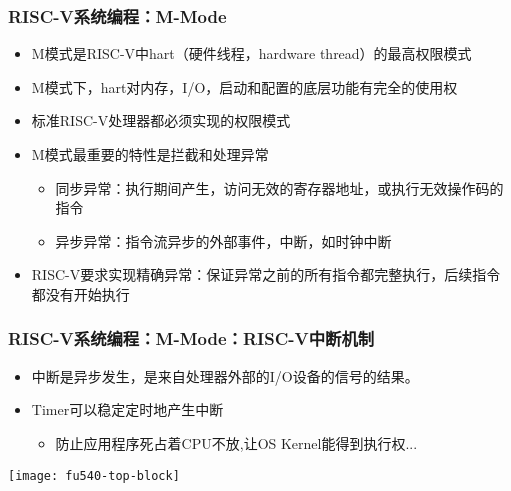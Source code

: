 \begin{frame}
    \frametitle{RISC-V系统编程：M-Mode}
    \begin{itemize}
        \item M模式是RISC-V中hart（硬件线程，hardware thread）的最高权限模式       
        \item M模式下，hart对内存，I/O，启动和配置的底层功能有完全的使用权
        \item 标准RISC-V处理器都必须实现的权限模式
        \item M模式最重要的特性是拦截和处理异常
        \begin{itemize}
            \item 同步异常：执行期间产生，访问无效的寄存器地址，或执行无效操作码的指令
            \item 异步异常：指令流异步的外部事件，中断，如时钟中断
        \end{itemize}				
        \item RISC-V要求实现精确异常：保证异常之前的所有指令都完整执行，后续指令都没有开始执行
    \end{itemize}
    
\end{frame}


\begin{frame}[plain]
    \frametitle{RISC-V系统编程：M-Mode：RISC-V中断机制}
    \begin{itemize}
        \item 中断是异步发生，是来自处理器外部的I/O设备的信号的结果。
        
        
        \item Timer可以稳定定时地产生中断
        \begin{itemize}
            \item 防止应用程序死占着CPU不放,让OS Kernel能得到执行权...
        \end{itemize}				
        
    \end{itemize}
    
    \centering
    \texttt{[image: fu540-top-block]}
    
\end{frame}


